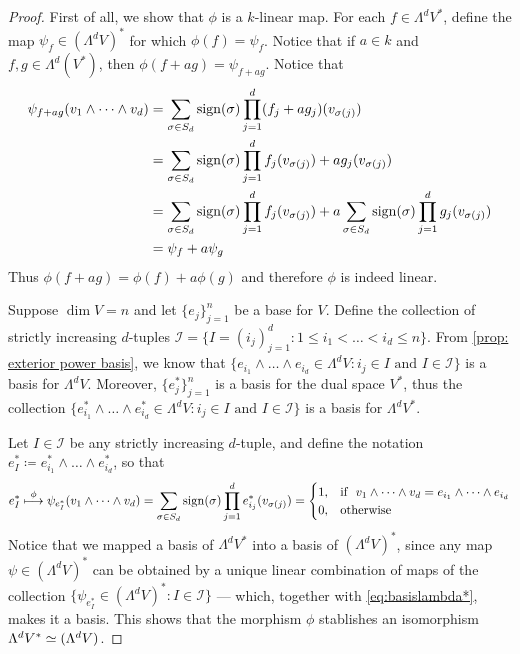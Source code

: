 \begin{proof}
First of all, we show that \(\phi\) is a \(k\)-linear map. For each \(f \in
\Lambda^d V^{*}\), define the map \(\psi_{f} \in (\Lambda^dV)^{*}\) for which
\(\phi(f) = \psi_f\). Notice that if \(a \in k\) and \(f, g \in
\Lambda^d(V^{*})\), then \(\phi(f + a g) = \psi_{f + a g}\). Notice that
\begin{align*}
\psi_{f + ag}(v_1 \wedge \dots \wedge v_d)
&= \sum_{\sigma \in S_d} \operatorname{sign}(\sigma)
  \prod_{j=1}^d (f_{j} + a g_{j})(v_{\sigma(j)}) \\
&= \sum_{\sigma \in S_d} \operatorname{sign}(\sigma)
  \prod_{j=1}^d f_j(v_{\sigma(j)}) + a g_j(v_{\sigma(j)}) \\
&= \sum_{\sigma \in S_d} \operatorname{sign}(\sigma) \prod_{j=1}^d f_j(v_{\sigma(j)})
+ a \sum_{\sigma \in S_d} \operatorname{sign}(\sigma) \prod_{j=1}^d g_j(v_{\sigma(j)}) \\
&= \psi_f + a \psi_g
\end{align*}
Thus \(\phi(f + ag) = \phi(f) + a \phi(g)\) and therefore \(\phi\) is indeed
linear.

Suppose \(\dim V = n\) and let \(\{e_{j}\}_{j=1}^n\) be a base for \(V\). Define
the collection of strictly increasing \(d\)-tuples \(\mathcal I = \{I =
(i_{j})_{j=1}^d \colon 1 \leq i_1 < \dots < i_d \leq n\}\). From \cref{prop: exterior
power basis}, we know that \(\{e_{i_{1}} \wedge \dots \wedge e_{i_{d}} \in
\Lambda^d V \colon i_j \in I \text{ and } I \in \mathcal I\}\) is a basis for
\(\Lambda^d V\). Moreover, \(\{e_{j}^{*}\}_{j=1}^n\) is a basis for the dual
space \(V^{*}\), thus the collection \(\{e_{i_{1}}^{*} \wedge \dots \wedge
e_{i_{d}}^{*} \in \Lambda^d V \colon i_j \in I \text{ and } I \in \mathcal I\}\) is a
basis for \(\Lambda^d V^{*}\).

Let \(I \in \mathcal I\) be any strictly increasing \(d\)-tuple, and define the
notation \(e_I^{*} \coloneq e_{i_1}^{*} \wedge \dots \wedge e_{i_d}^{*}\), so
that
\begin{equation}
\label{eq:basislambda*}
e_I^{*} \overset{\phi}\longmapsto
\psi_{e_I^{*}}(v_1 \wedge \dots \wedge v_d)
= \sum_{\sigma \in S_{d}} \operatorname{sign}(\sigma) \prod_{j=1}^d e_{i_j}^{*}(v_{\sigma(j)}) =
\begin{cases}
  1, &\text{if }\ v_1 \wedge \dots \wedge v_d
        = e_{i_1} \wedge \dots \wedge e_{i_d} \\
  0, &\text{otherwise}
\end{cases}
\end{equation}
Notice that we mapped a basis of \(\Lambda^d V^{*}\) into a basis of
\((\Lambda^d V)^{*}\), since any map \(\psi \in (\Lambda^d V)^{*}\) can be
obtained by a unique linear combination of maps of the collection
\(\{\psi_{e_{I}^{*}} \in (\Lambda^d V)^{*} \colon I \in \mathcal I\}\) --- which,
together with \cref{eq:basislambda*}, makes it a basis. This shows that the
morphism \(\phi\) stablishes an isomorphism \(\Lambda^dV^{*} \simeq (\Lambda^d
V)\).
\end{proof}


